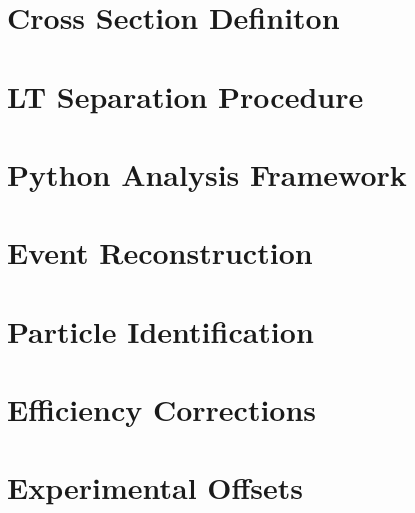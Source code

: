 \label{Chapter-5}

\hypertarget{Section-5.1}{%
\section{Cross Section Definiton}\label{Section-5.1}}

\hypertarget{Section-5.2}{%
\section{LT Separation Procedure}\label{Section-5.2}}

\hypertarget{Section-5.3}{%
\section{Python Analysis Framework}\label{Section-5.3}}

\hypertarget{Section-5.4}{%
\section{Event Reconstruction}\label{Section-5.4}}

\hypertarget{Section-5.5}{%
\section{Particle Identification}\label{Section-5.5}}

\hypertarget{Section-5.6}{%
\section{Efficiency Corrections}\label{Section-5.6}}

\hypertarget{Section-5.7}{%
\section{Experimental Offsets}\label{Section-5.7}}


